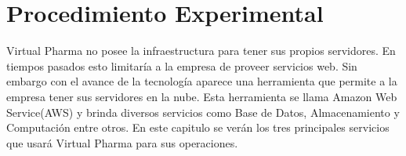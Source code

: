 \section*{Procedimiento Experimental}\label{sec:Procedimiento Experimental}

Virtual Pharma no posee la infraestructura para tener sus propios servidores. En tiempos pasados esto limitaría a la empresa de proveer servicios web. Sin embargo con el avance de la tecnología aparece una herramienta que permite a la empresa tener sus servidores en la nube. Esta herramienta se llama Amazon Web Service(AWS) y brinda diversos servicios como Base de Datos, Almacenamiento y Computación entre otros. En este capitulo se verán los tres principales servicios que usará Virtual Pharma para sus operaciones.